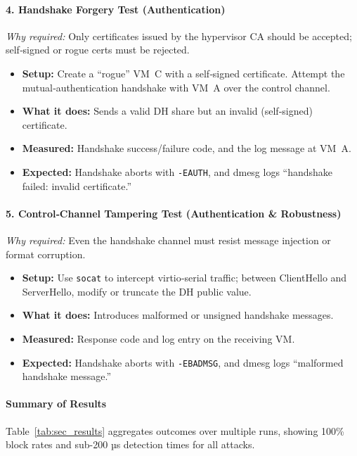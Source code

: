 \documentclass[conference]{IEEEtran}
\begin{document}
\paragraph{4. Handshake Forgery Test (Authentication)}
\emph{Why required:} Only certificates issued by the hypervisor CA should be accepted; self‐signed or rogue certs must be rejected.
\begin{itemize}
  \item \textbf{Setup:} Create a “rogue” VM~C with a self‐signed certificate. Attempt the mutual‐authentication handshake with VM~A over the control channel.
  \item \textbf{What it does:} Sends a valid DH share but an invalid (self‐signed) certificate.
  \item \textbf{Measured:} Handshake success/failure code, and the log message at VM~A.
  \item \textbf{Expected:} Handshake aborts with \texttt{-EAUTH}, and dmesg logs “handshake failed: invalid certificate.”
\end{itemize}

\paragraph{5. Control‐Channel Tampering Test (Authentication \& Robustness)}
\emph{Why required:} Even the handshake channel must resist message injection or format corruption.
\begin{itemize}
  \item \textbf{Setup:} Use \texttt{socat} to intercept virtio‐serial traffic; between ClientHello and ServerHello, modify or truncate the DH public value.
  \item \textbf{What it does:} Introduces malformed or unsigned handshake messages.
  \item \textbf{Measured:} Response code and log entry on the receiving VM.
  \item \textbf{Expected:} Handshake aborts with \texttt{-EBADMSG}, and dmesg logs “malformed handshake message.”
\end{itemize}

\paragraph{Summary of Results}
Table~\ref{tab:sec_results} aggregates outcomes over multiple runs, showing
100\% block rates and sub-200 µs detection times for all attacks.
\end{document}
